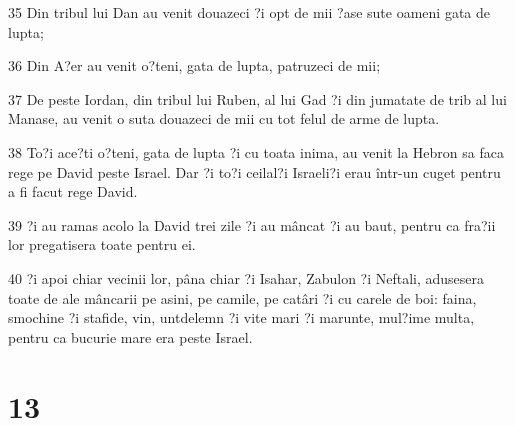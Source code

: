 \par 35 Din tribul lui Dan au venit douazeci ?i opt de mii ?ase sute oameni gata de lupta;
\par 36 Din A?er au venit o?teni, gata de lupta, patruzeci de mii;
\par 37 De peste Iordan, din tribul lui Ruben, al lui Gad ?i din jumatate de trib al lui Manase, au venit o suta douazeci de mii cu tot felul de arme de lupta.
\par 38 To?i ace?ti o?teni, gata de lupta ?i cu toata inima, au venit la Hebron sa faca rege pe David peste Israel. Dar ?i to?i ceilal?i Israeli?i erau într-un cuget pentru a fi facut rege David.
\par 39 ?i au ramas acolo la David trei zile ?i au mâncat ?i au baut, pentru ca fra?ii lor pregatisera toate pentru ei.
\par 40 ?i apoi chiar vecinii lor, pâna chiar ?i Isahar, Zabulon ?i Neftali, adusesera toate de ale mâncarii pe asini, pe camile, pe catâri ?i cu carele de boi: faina, smochine ?i stafide, vin, untdelemn ?i vite mari ?i marunte, mul?ime multa, pentru ca bucurie mare era peste Israel.

\chapter{13}

